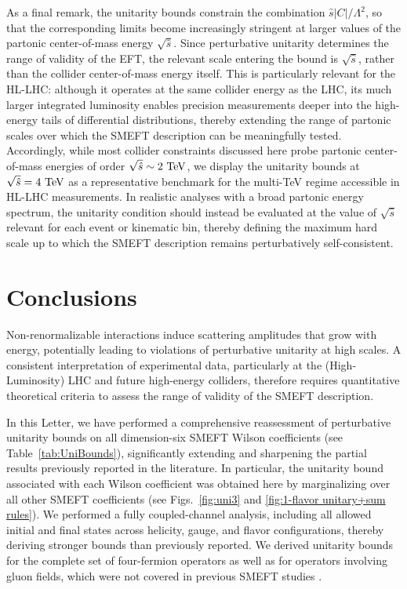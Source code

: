 \documentclass[
aps,
prd,
10pt,
twocolumn,
oneside,
preprintnumbers,
superscriptaddress,
amsmath,
amssymb,
nofootinbib,
flushbottom]{revtex4-2}
\begin{document}
As a final remark, the unitarity bounds constrain the
combination $\hat s|C|/\Lambda^2$, so that the
corresponding limits become increasingly stringent at
larger values of the partonic center-of-mass energy
$\sqrt{\hat s}$. Since perturbative unitarity determines
the range of validity of the EFT, the relevant scale
entering the bound is $\sqrt{\hat s}$, rather than the
collider center-of-mass energy itself. This is
particularly relevant for the HL-LHC: although it
operates at the same collider energy as the LHC, its
much larger integrated luminosity enables precision
measurements deeper into the high-energy tails of
differential distributions, thereby extending the range
of partonic scales over which the SMEFT description can
be meaningfully tested. Accordingly, while most collider
constraints discussed here probe partonic
center-of-mass energies of order
$\sqrt{\hat s}\sim2~{\rm TeV}$, we display the unitarity
bounds at $\sqrt{\hat s}=4~{\rm TeV}$ as a
representative benchmark for the multi-TeV regime
accessible in HL-LHC measurements. In realistic
analyses with a broad partonic energy spectrum, the
unitarity condition should instead be evaluated at the
value of $\sqrt{\hat s}$ relevant for each event or
kinematic bin, thereby defining the maximum hard scale
up to which the SMEFT description remains
perturbatively self-consistent.

\section{Conclusions}

Non-renormalizable interactions induce scattering amplitudes that grow
with energy, potentially leading to violations of perturbative
unitarity at high scales.
A consistent interpretation of experimental
data, particularly at the (High-Luminosity) LHC and future high-energy
colliders, therefore requires quantitative theoretical criteria to
assess the range of validity of the SMEFT description.

In this Letter, we have performed a comprehensive reassessment of perturbative unitarity bounds on all dimension-six SMEFT Wilson coefficients (see Table~\ref{tab:UniBounds}), significantly extending and sharpening the partial results previously reported in the literature.
In particular, the unitarity bound associated with each Wilson coefficient was obtained here by marginalizing over all other SMEFT coefficients (see Figs.~\ref{fig:uni3} and \ref{fig:1-flavor unitary+sum rules}).
We performed a fully coupled-channel analysis, including all allowed initial and final states across helicity, gauge, and flavor configurations, thereby deriving stronger bounds than previously reported. 
We derived unitarity bounds
for the complete set of four-fermion operators as well as for operators
involving gluon fields, which were not covered in previous SMEFT
studies \cite{Corbett:2014ora,Corbett:2017qgl,Cao:2023qks}.
\end{document}
